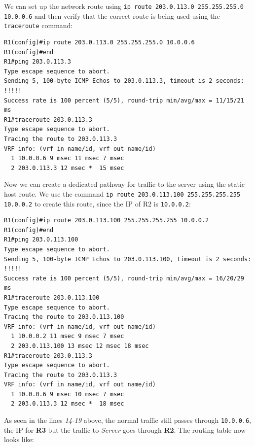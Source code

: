\noindent
We can set up the network route using \verb|ip route 203.0.113.0 255.255.255.0 10.0.0.6| and then verify that the correct route is being used using the \verb|traceroute| command:

\vspace{-15pt}
\begin{verbatim}
R1(config)#ip route 203.0.113.0 255.255.255.0 10.0.0.6
R1(config)#end
R1#ping 203.0.113.3
Type escape sequence to abort.
Sending 5, 100-byte ICMP Echos to 203.0.113.3, timeout is 2 seconds:
!!!!!
Success rate is 100 percent (5/5), round-trip min/avg/max = 11/15/21 ms
R1#traceroute 203.0.113.3
Type escape sequence to abort.
Tracing the route to 203.0.113.3
VRF info: (vrf in name/id, vrf out name/id)
  1 10.0.0.6 9 msec 11 msec 7 msec
  2 203.0.113.3 12 msec *  15 msec
\end{verbatim}
\vspace{-10pt}

\noindent
Now we can create a dedicated pathway for traffic to the server using the static host route. We use the command \verb|ip route 203.0.113.100 255.255.255.255 10.0.0.2| to create this route, since the IP of R2 is \verb|10.0.0.2|:

\vspace{-15pt}
\begin{verbatim}
R1(config)#ip route 203.0.113.100 255.255.255.255 10.0.0.2
R1(config)#end
R1#ping 203.0.113.100
Type escape sequence to abort.
Sending 5, 100-byte ICMP Echos to 203.0.113.100, timeout is 2 seconds:
!!!!!
Success rate is 100 percent (5/5), round-trip min/avg/max = 16/20/29 ms
R1#traceroute 203.0.113.100
Type escape sequence to abort.
Tracing the route to 203.0.113.100
VRF info: (vrf in name/id, vrf out name/id)
  1 10.0.0.2 11 msec 9 msec 7 msec
  2 203.0.113.100 13 msec 12 msec 18 msec
R1#traceroute 203.0.113.3  
Type escape sequence to abort.
Tracing the route to 203.0.113.3
VRF info: (vrf in name/id, vrf out name/id)
  1 10.0.0.6 9 msec 10 msec 7 msec
  2 203.0.113.3 12 msec *  18 msec
\end{verbatim}
\vspace{-10pt}

\noindent
As seen in the lines \textit{14-19} above, the normal traffic still passes through \verb|10.0.0.6|, the IP for \textbf{R3} but the traffic to \textit{Server} goes through \textbf{R2}. The routing table now looks like:

